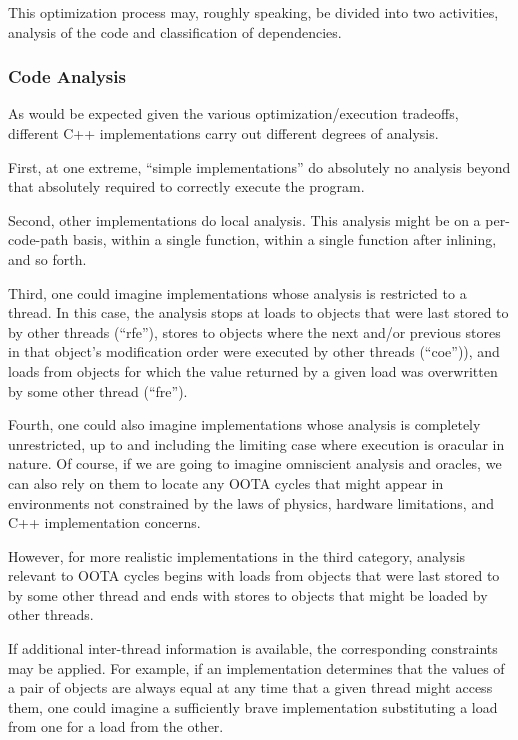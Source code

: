 \documentclass[10]{article}
\begin{document}
This optimization process may, roughly speaking, be divided into two
activities, analysis of the code and classification of dependencies.

\subsubsection{Code Analysis}
\label{sec:Code Analysis}

As would be expected given the various optimization/execution tradeoffs,
different C++ implementations carry out different degrees of analysis.

First, at one extreme, ``simple implementations'' do absolutely no
analysis beyond that absolutely required to correctly execute the program.

Second, other implementations do local analysis.
This analysis might be on a per-code-path basis, within a single function,
within a single function after inlining, and so forth.

Third, one could imagine implementations whose analysis is restricted to
a thread.
In this case, the analysis stops at loads to objects that were last
stored to by other threads (``rfe''), stores to objects where the next
and/or previous stores in that object's modification order were executed
by other threads (``coe'')), and loads from objects for which the value
returned by a given load was overwritten by some other thread (``fre'').

Fourth, one could also imagine implementations whose analysis is
completely unrestricted, up to and including the limiting case where
execution is oracular in nature.
Of course, if we are going to imagine omniscient analysis and oracles,
we can also rely on them to locate any OOTA cycles that might appear
in environments not constrained by the laws of physics, hardware
limitations, and C++ implementation concerns.

However, for more realistic implementations in the third category,
analysis relevant to OOTA cycles begins with loads from objects that were
last stored to by some other thread and ends with stores to objects that
might be loaded by other threads.

If additional inter-thread information is available, the corresponding
constraints may be applied.
For example, if an implementation determines that the values of a pair
of objects are always equal at any time that a given thread might access
them, one could imagine a sufficiently brave implementation substituting
a load from one for a load from the other.
\end{document}
